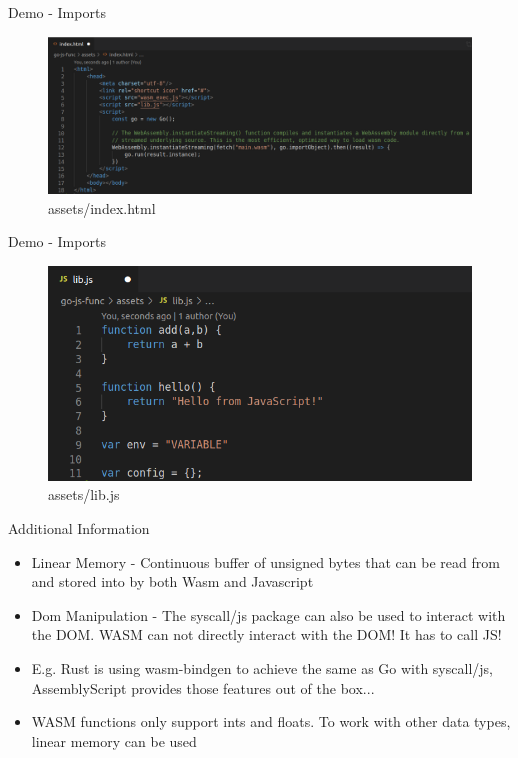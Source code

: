\documentclass{beamer}
\begin{document}
\begin{frame}{Demo - Imports}
    \begin{figure}
        \includegraphics[scale=0.2]{./images/importindex.png}
        \caption{assets/index.html}
    \end{figure}

\end{frame}

\begin{frame}{Demo - Imports}
    \begin{figure}
        \includegraphics[scale=0.4]{./images/lib.png}
        \caption{assets/lib.js}
    \end{figure}

\end{frame}

\begin{frame}{Additional Information}
    \begin{itemize}
        \item Linear Memory - Continuous buffer of unsigned bytes that can be read from and stored into by both Wasm and Javascript
        \item Dom Manipulation - The syscall/js package can also be used to interact with the DOM. WASM can not directly interact with the DOM! It has to call JS!
        \item E.g. Rust is using wasm-bindgen to achieve the same as Go with syscall/js, AssemblyScript provides those features out of the box...
        \item WASM functions only support ints and floats. To work with other data types, linear memory can be used
    \end{itemize}
\end{frame}
\end{document}
